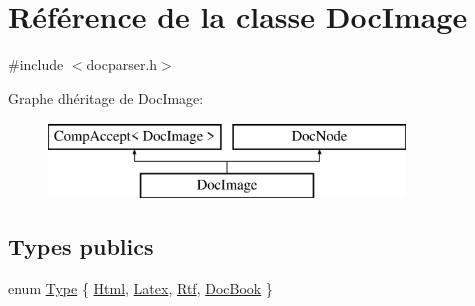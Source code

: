 \hypertarget{class_doc_image}{}\section{Référence de la classe Doc\+Image}
\label{class_doc_image}


{\ttfamily \#include $<$docparser.\+h$>$}

Graphe d\textquotesingle{}héritage de Doc\+Image\+:\begin{figure}[H]
\begin{center}
\leavevmode
\includegraphics[height=2.000000cm]{class_doc_image}
\end{center}
\end{figure}
\subsection*{Types publics}
\begin{DoxyCompactItemize}
\item 
enum \hyperlink{class_doc_image_aaa49d1dad195745ff9d470c5335be93e}{Type} \{ \hyperlink{class_doc_image_aaa49d1dad195745ff9d470c5335be93ea11831c0ddc505e031751197b1bab0623}{Html}, 
\hyperlink{class_doc_image_aaa49d1dad195745ff9d470c5335be93eaa40720221c0f30f373e9b3a9ec9711e5}{Latex}, 
\hyperlink{class_doc_image_aaa49d1dad195745ff9d470c5335be93eaf742255bd9dc963b18e768c2b7fb7d70}{Rtf}, 
\hyperlink{class_doc_image_aaa49d1dad195745ff9d470c5335be93ea725d162f5603b60f365bad17013c5d5a}{Doc\+Book}
 \}
\end{DoxyCompactItemize}

